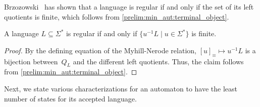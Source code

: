 Brzozowski~\cite{DBLP:journals/jacm/Brzozowski64}
has shown that a language is regular if and only if the set of its left quotients is finite, which follows from \cref{prelim:min_aut:terminal_object}.

\begin{corollary}
	\label{prelim:thm:regular_iff_quotients_finite}
	A language $L \subseteq \Sigma^*$
	is regular if and only if $\{ u^{-1}L \mid u \in \Sigma^*\}$
	is finite.
\end{corollary}
\begin{proof}
 By the defining equation of the Myhill-Nerode relation, $[u]_{\equiv} \mapsto u^{-1}L$
 is a bijection between~$Q_L$ and the different left quotients.
 Thus, the claim follows from \cref{prelim:min_aut:terminal_object}.
\end{proof}

Next, we state various characterizations for an automaton
to have the least number of states for its accepted language.

